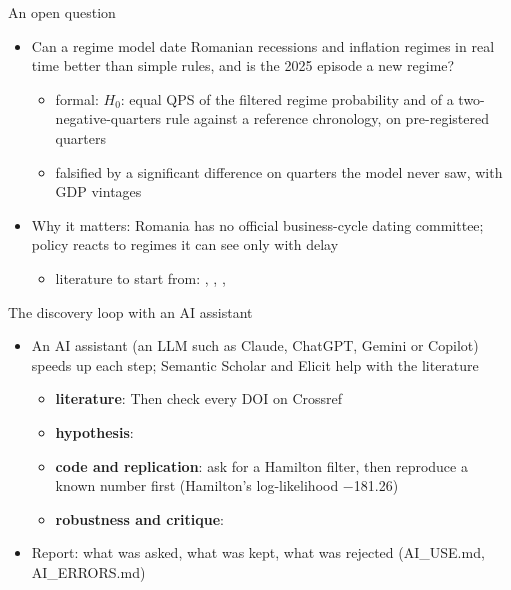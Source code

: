 \begin{frame}{An open question}
\itemsize{\small}
\begin{itemize}
    \item Can a regime model date Romanian recessions and inflation regimes in real time better than simple rules, and is the 2025 episode a new regime?
    \begin{itemize}
        \item formal: $H_0$: equal QPS of the filtered regime probability and of a two-negative-quarters rule against a reference chronology, on pre-registered quarters
        \item falsified by a significant difference on quarters the model never saw, with GDP vintages
    \end{itemize}
    \item Why it matters: Romania has no official business-cycle dating committee; policy reacts to regimes it can see only with delay
    \begin{itemize}
        \item literature to start from: , , , 
    \end{itemize}
\end{itemize}
\end{frame}

\begin{frame}{The discovery loop with an AI assistant}
\itemsize{\footnotesize}
\begin{itemize}
    \item An AI assistant (an LLM such as Claude, ChatGPT, Gemini or Copilot) speeds up each step; Semantic Scholar and Elicit help with the literature
    \begin{itemize}
        \item \textbf{literature}:  Then check every DOI on Crossref
        \item \textbf{hypothesis}: 
        \item \textbf{code and replication}: ask for a Hamilton filter, then reproduce a known number first (Hamilton's log-likelihood \ensuremath{-}181.26)
        \item \textbf{robustness and critique}: 
    \end{itemize}
    \item Report: what was asked, what was kept, what was rejected (AI\_USE.md, AI\_ERRORS.md)
\end{itemize}
\end{frame}

